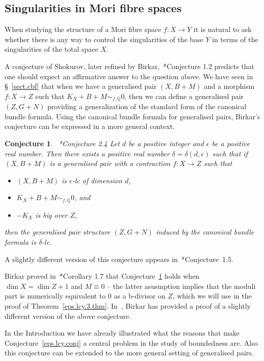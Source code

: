 \documentclass[11pt]{ip-journal}
\newtheorem{conjecture}[theorem]{Conjecture}
\theoremstyle{definition}
\begin{document}
\subsection{Singularities in Mori fibre spaces}
When studying the structure of a Mori fibre space $f \colon X \to Y$ it is natural to ask whether there is any way to control the singularities of the base $Y$ in terms of the singularities of the total space $X$.

A conjecture of Shokurov, later refined by Birkar,~\cite{MR3507921}*{Conjecture 1.2} predicts that one should expect an affirmative answer to the question above.
We have seen in \S~\ref{sect.cbf} that when we have a generalised pair $(X, B+M)$ and a morphism $f \colon X \to Z$ such that $K_X+B+M \sim_{f, \mathbb{Q}} 0$, then we can define a generalised pair $(Z, G+N)$ providing a generalization of the standard form of the canonical bundle formula.
Using the canonical bundle formula for generalised pairs, Birkar's conjecture can be expressed in a more general context.


\begin{conjecture} \label{rel.bab.gen.conj}~\cite{1811.10709}*{Conjecture 2.4}
Let $d$ be a positive integer and $\epsilon$ be a positive real number.
Then there exists a positive real number $\delta = \delta(d, \epsilon)$ such that if $(X, B+M)$ is a generalised pair with a contraction $f \colon X \to Z$ such that 
\begin{itemize}
\item $(X, B+M)$ is $\epsilon$-lc of dimension $d$,
\item $K_X+B+M\sim_{f, \mathbb{Q}} 0$, and
\item $-K_X$ is big over $Z$,
\end{itemize}
then the generalised pair structure $(Z, G+N)$ induced by the canonical bundle formula is $\delta$-lc.
\end{conjecture}

A slightly different version of this conjecture appears in~\cite{MR4436596}*{Conjecture~1.5}.

Birkar proved in~\cite{MR3507921}*{Corollary 1.7} that Conjecture~\ref{rel.bab.gen.conj} holds when 
$\dim X=\dim Z +1$
and 
$M \equiv 0$
-- the latter asusmption implies that the moduli part is numerically equivalent to 
$0$ 
as a b-divisor on 
$Z$, 
which we will use in the proof of 
Theorem~\ref{eps.lcy.3.thm}.
In~\cite{birkar.last}, Birkar has provided a proof of a slightly different version of the above conjecture.

In the Introduction we have already illustrated what the reasons that make Conjecture~\ref{eps.lcy.conj} a central problem in the study of boundedness are. 
Also this conjecture can be extended to the more general setting of generalised pairs.
\end{document}
